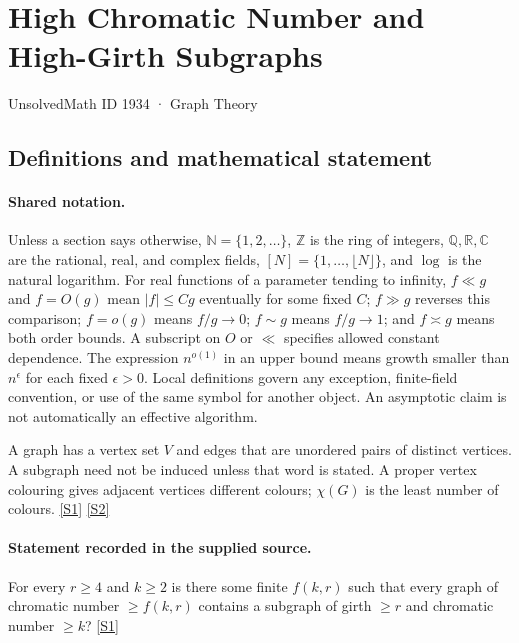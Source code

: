 \documentclass[11pt,a4paper]{article}
\newcommand{\N}{\mathbb{N}}
\newcommand{\Z}{\mathbb{Z}}
\newcommand{\Q}{\mathbb{Q}}
\newcommand{\R}{\mathbb{R}}
\newcommand{\C}{\mathbb{C}}
\newcommand{\sref}[2]{\hyperlink{source:#1:#2}{[S#2]}}
\begin{document}

\setcounter{section}{1933}

\section{High Chromatic Number and High-Girth Subgraphs}\label{1934}

{\small\sffamily UnsolvedMath ID 1934 · Graph Theory}

\subsection{Definitions and mathematical statement}

\paragraph{Shared notation.}Unless a section says otherwise, $\N=\{1,2,\ldots\}$,
$\Z$ is the ring of integers, $\Q,\R,\C$ are the rational, real, and complex
fields, $[N]=\{1,\ldots,\lfloor N\rfloor\}$, and $\log$ is the natural
logarithm. For real functions of a parameter tending to infinity,
$f\ll g$ and $f=O(g)$ mean $|f|\leq Cg$ eventually for some fixed $C$;
$f\gg g$ reverses this comparison; $f=o(g)$ means $f/g\to0$;
$f\sim g$ means $f/g\to1$; and $f\asymp g$ means both order bounds.
A subscript on $O$ or $\ll$ specifies allowed constant dependence.
The expression $n^{o(1)}$ in an upper bound means growth smaller than
$n^\epsilon$ for each fixed $\epsilon>0$. Local definitions govern any
exception, finite-field convention, or use of the same symbol for another
object. An asymptotic claim is not automatically an effective algorithm.



A graph has a vertex set $V$ and edges that are unordered pairs of distinct vertices. A subgraph need not be induced unless that word is stated. A proper vertex colouring gives adjacent vertices different colours; $\chi(G)$ is the least number of colours. \sref{1934}{1} \sref{1934}{2}

\paragraph{Statement recorded in the supplied source.}
For every $r\geq 4$ and $k\geq 2$ is there some finite $f(k,r)$ such that every graph of chromatic number $\geq f(k,r)$ contains a subgraph of girth $\geq r$ and chromatic number $\geq k$? \sref{1934}{1}
\end{document}
